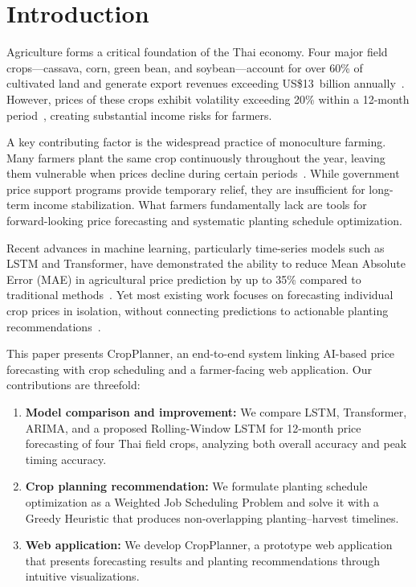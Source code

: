 \documentclass[conference]{IEEEtran}
\begin{document}
\section{Introduction}

Agriculture forms a critical foundation of the Thai economy. Four major field crops---cassava, corn, green bean, and soybean---account for over 60\% of cultivated land and generate export revenues exceeding US\$13~billion annually~\cite{oae2024stats, oae2024forecast, ocsb2024, thairice2024}. However, prices of these crops exhibit volatility exceeding 20\% within a 12-month period~\cite{waqas2024climate}, creating substantial income risks for farmers.

A key contributing factor is the widespread practice of monoculture farming. Many farmers plant the same crop continuously throughout the year, leaving them vulnerable when prices decline during certain periods~\cite{asg2014}. While government price support programs provide temporary relief, they are insufficient for long-term income stabilization. What farmers fundamentally lack are tools for forward-looking price forecasting and systematic planting schedule optimization.

Recent advances in machine learning, particularly time-series models such as LSTM and Transformer, have demonstrated the ability to reduce Mean Absolute Error (MAE) in agricultural price prediction by up to 35\% compared to traditional methods~\cite{rohan2025crop}. Yet most existing work focuses on forecasting individual crop prices in isolation, without connecting predictions to actionable planting recommendations~\cite{javaid2023ai}.

This paper presents CropPlanner, an end-to-end system linking AI-based price forecasting with crop scheduling and a farmer-facing web application. Our contributions are threefold:

\begin{enumerate}
  \item \textbf{Model comparison and improvement:} We compare LSTM, Transformer, ARIMA, and a proposed Rolling-Window LSTM for 12-month price forecasting of four Thai field crops, analyzing both overall accuracy and peak timing accuracy.
  \item \textbf{Crop planning recommendation:} We formulate planting schedule optimization as a Weighted Job Scheduling Problem and solve it with a Greedy Heuristic that produces non-overlapping planting--harvest timelines.
  \item \textbf{Web application:} We develop CropPlanner, a prototype web application that presents forecasting results and planting recommendations through intuitive visualizations.
\end{enumerate}
\end{document}

